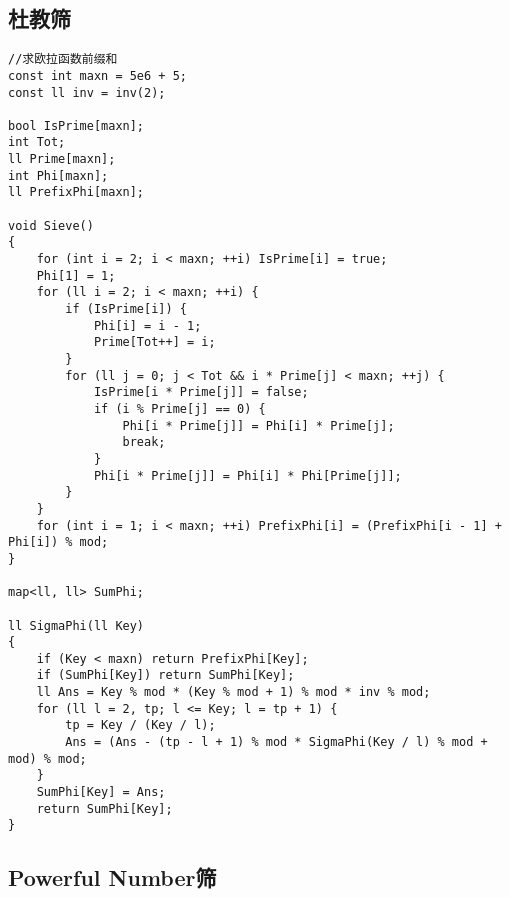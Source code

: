 \documentclass[twocolumn,a4]{article}
\begin{document}
\subsection{杜教筛}
\begin{lstlisting}
//求欧拉函数前缀和
const int maxn = 5e6 + 5;
const ll inv = inv(2);

bool IsPrime[maxn];
int Tot;
ll Prime[maxn];
int Phi[maxn];
ll PrefixPhi[maxn];

void Sieve()
{
    for (int i = 2; i < maxn; ++i) IsPrime[i] = true;
    Phi[1] = 1;
    for (ll i = 2; i < maxn; ++i) {
        if (IsPrime[i]) {
            Phi[i] = i - 1;
            Prime[Tot++] = i;
        }
        for (ll j = 0; j < Tot && i * Prime[j] < maxn; ++j) {
            IsPrime[i * Prime[j]] = false;
            if (i % Prime[j] == 0) {
                Phi[i * Prime[j]] = Phi[i] * Prime[j];
                break;
            }
            Phi[i * Prime[j]] = Phi[i] * Phi[Prime[j]];
        }
    }
    for (int i = 1; i < maxn; ++i) PrefixPhi[i] = (PrefixPhi[i - 1] + Phi[i]) % mod;
}

map<ll, ll> SumPhi;

ll SigmaPhi(ll Key)
{
    if (Key < maxn) return PrefixPhi[Key];
    if (SumPhi[Key]) return SumPhi[Key];
    ll Ans = Key % mod * (Key % mod + 1) % mod * inv % mod;
    for (ll l = 2, tp; l <= Key; l = tp + 1) {
        tp = Key / (Key / l);
        Ans = (Ans - (tp - l + 1) % mod * SigmaPhi(Key / l) % mod + mod) % mod;
    }
    SumPhi[Key] = Ans;
    return SumPhi[Key];
}
\end{lstlisting}

\subsection{Powerful Number筛}
\begin{lstlisting}

\end{lstlisting}
\end{document}
